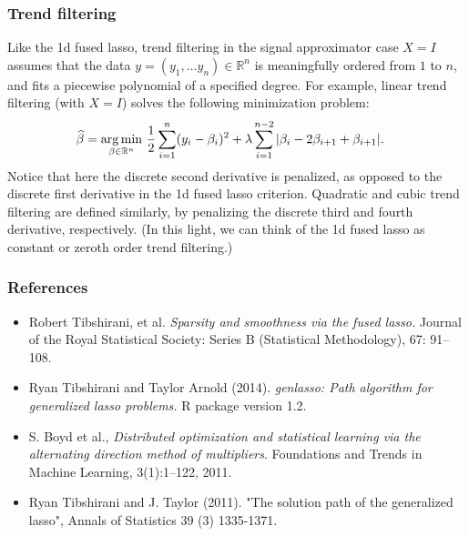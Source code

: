 \begin{frame}
  \frametitle{Trend filtering}
\small

Like the 1d fused lasso, trend filtering in the signal approximator case $X=I$ assumes
that the data $y=(y_1,\ldots y_n) \in \mathbb{R}^n$ is meaningfully ordered from $1$ to $n$,
and fits a piecewise polynomial of a specified degree. For example, linear trend filtering
(with $X=I$) solves the following minimization problem:
\begin{align}
\widehat{\beta} &= \mathop{\mathrm{arg\,min}}_{\beta \in \mathbb{R}^n} \, \frac{1}{2} \sum_{i=1}^n (y_i-\beta_i)^2 +
\lambda \sum_{i=1}^{n-2} |\beta_i - 2\beta_{i+1} + \beta_{i+1}|.
\end{align}
Notice that here the discrete second derivative is penalized, as opposed to the discrete
first derivative in the 1d fused lasso criterion. Quadratic and cubic
trend filtering are defined similarly, by penalizing the discrete third and fourth
derivative, respectively. (In this light, we can think of the 1d fused lasso as constant
or zeroth order trend filtering.)

\end{frame}


\begin{frame}
  \frametitle{References}
  \footnotesize

  \begin{itemize}
  \item Robert Tibshirani, et al. {\it Sparsity and smoothness via the fused lasso.}
  Journal of the Royal Statistical Society: Series B (Statistical Methodology), 67: 91–108.
  \item Ryan Tibshirani and
  Taylor Arnold (2014). {\it genlasso: Path algorithm for generalized lasso problems.}
  R package version 1.2.
  \item  S. Boyd et al.,
  {\it Distributed optimization and statistical learning via the alternating
  direction method of multipliers}. Foundations and Trends in Machine Learning,
  3(1):1–122, 2011.
  \item Ryan Tibshirani and J. Taylor (2011). "The solution path of the
     generalized lasso", Annals of Statistics 39 (3) 1335-1371.
  \end{itemize}
\end{frame}















